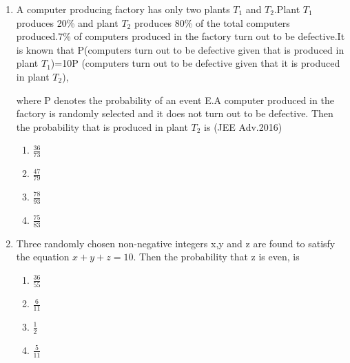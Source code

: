 \documentclass[journal,12pt,twocolumn]{IEEEtran}
\theoremstyle{remark}
\begin{document}
\begin{enumerate}[start=16]
\begin{multicols}{4}
\begin{enumerate}
    \item $\frac{1}{2}$
    \item $\frac{1}{3}$
    \item $\frac{2}{3}$
    \item $\frac{3}{4}$
\end{enumerate}
\end{multicols}
\item A computer producing factory has only two plants $T_{1}$ and $T_{2}$.Plant $T_{1}$ produces 20\% and plant $T_{2}$ produces 80\% of the total computers produced.7\% of computers produced in the factory turn out to be defective.It is known that P(computers turn out to be defective given that is produced in plant $T_{1}$)=10P (computers turn out to be defective given that it is produced in plant $T_{2}$),

where P denotes the probability of an event E.A computer produced in the factory is randomly selected and it does not turn out to be defective. Then the probability that is produced in plant $T_{2}$ is \hfill (JEE Adv.2016)
\begin{multicols}{4}
\begin{enumerate}
    \item $\frac{36}{73}$
    \item $\frac{47}{79}$
    \item $\frac{78}{93}$
    \item $\frac{75}{83}$
\end{enumerate}
    
\end{multicols}






\item Three randomly chosen non-negative integers x,y and z are found to satisfy the equation $x+y+z=10$. Then the probability that z is even, is
\begin{multicols}{4}
\begin{enumerate}
    \item $\frac{36}{55}$
    \item $\frac{6}{11}$
    \item $\frac{1}{2}$
    \item $\frac{5}{11}$
\end{enumerate}
\end{multicols}
\end{enumerate}
\end{document}
